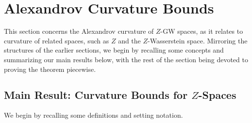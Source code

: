\documentclass{article}
\theoremstyle{definition}
\begin{document}
%
%
%

%
%
%
%
%
%
%
%
%
%
%
%
%
%
%
%
%
%
%
%
%
%
%

%

%
%
%

%
%
%

\section{Alexandrov Curvature Bounds}\label{sec:curvature}

This section concerns the Alexandrov curvature of $Z$-GW spaces, as it relates to curvature of related spaces, such as $Z$ and the $Z$-Wasserstein space. Mirroring the structures of the earlier sections, we begin by recalling some concepts and summarizing our main results below, with the rest of the section being devoted to proving the theorem piecewise.



\subsection{Main Result: Curvature Bounds for \texorpdfstring{$Z$}{Z}-Spaces}

We begin by recalling some definitions and setting notation.
\end{document}
